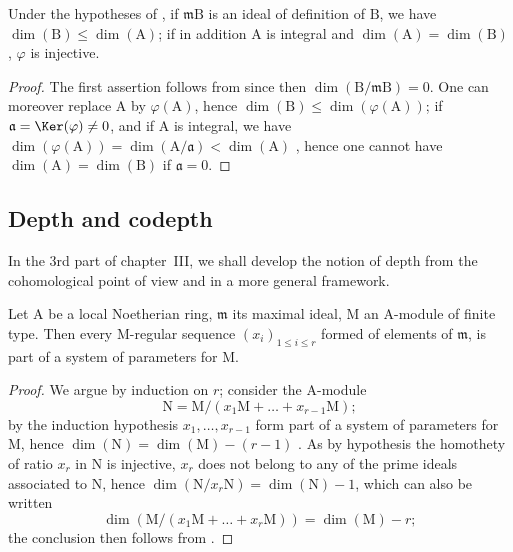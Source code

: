 \begin{corollary}[16.3.10]
\label{0.16.3.10}
Under the hypotheses of , if $\mathfrak{m}\mathrm{B}$ is an ideal of definition of $\mathrm{B}$, we have $\dim(\mathrm{B})\leq\dim(\mathrm{A})$; if in addition $\mathrm{A}$ is integral and $\dim(\mathrm{A})=\dim(\mathrm{B})$, $\varphi$ is injective.
\end{corollary}

\begin{proof}
The first assertion follows from  since then $\dim(\mathrm{B}/\mathfrak{m}\mathrm{B})=0$.
One can moreover replace $\mathrm{A}$ by $\varphi(\mathrm{A})$, hence $\dim(\mathrm{B})\leq\dim(\varphi(\mathrm{A}))$; if $\mathfrak{a}=\Ker(\varphi)\neq 0$, and if $\mathrm{A}$ is integral, we have $\dim(\varphi(\mathrm{A}))=\dim(\mathrm{A}/\mathfrak{a})<\dim(\mathrm{A})$ , hence one cannot have $\dim(\mathrm{A})=\dim(\mathrm{B})$ if $\mathfrak{a}=0$.
\end{proof}

\subsection{Depth and codepth}
\label{subsection:0.16.4}

\begin{env}[16.4.0]
\label{0.16.4.0}
In the 3rd part of chapter~III, we shall develop the notion of depth from the cohomological point of view and in a more general framework.
\end{env}

\begin{proposition}[16.4.1]
\label{0.16.4.1}
Let $\mathrm{A}$ be a local Noetherian ring, $\mathfrak{m}$ its maximal ideal, $\mathrm{M}$ an $\mathrm{A}$-module of finite type.
Then every $\mathrm{M}$-regular sequence $(x_i)_{1\leq i\leq r}$  formed of elements of $\mathfrak{m}$, is part of a system of parameters for $\mathrm{M}$.
\end{proposition}

\begin{proof}
We argue by induction on $r$; consider the $\mathrm{A}$-module
\[
  \mathrm{N}=\mathrm{M}/(x_1\mathrm{M}+\ldots+x_{r-1}\mathrm{M});
\]
by the induction hypothesis $x_1,\ldots,x_{r-1}$ form part of a system of parameters for $\mathrm{M}$, hence $\dim(\mathrm{N})=\dim(\mathrm{M})-(r-1)$ .
As by hypothesis the homothety of ratio $x_r$ in $\mathrm{N}$ is injective, $x_r$ does not belong to any of the prime ideals associated to $\mathrm{N}$, hence  $\dim(\mathrm{N}/x_r\mathrm{N})=\dim(\mathrm{N})-1$, which can also be written
\[
  \dim(\mathrm{M}/(x_1\mathrm{M}+\ldots+x_r\mathrm{M}))=\dim(\mathrm{M})-r;
\]
the conclusion then follows from .
\end{proof}


